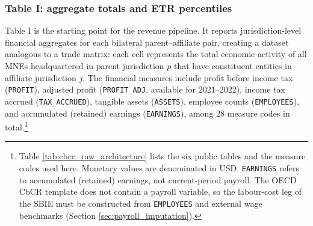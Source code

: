 \documentclass[11pt,a4paper]{article}
\newcommand{\code}[1]{\texttt{#1}}
\begin{document}
\subsubsection{Table I: aggregate totals and ETR percentiles}\label{sec:t1_main}

Table I is the starting point for the revenue pipeline. It reports jurisdiction-level financial aggregates for each bilateral parent--affiliate pair, creating a dataset analogous to a trade matrix: each cell represents the total economic activity of all MNEs headquartered in parent jurisdiction $p$ that have constituent entities in affiliate jurisdiction $j$. The financial measures include profit before income tax (\code{PROFIT}), adjusted profit (\code{PROFIT\_ADJ}, available for 2021--2022), income tax accrued (\code{TAX\_ACCRUED}), tangible assets (\code{ASSETS}), employee counts (\code{EMPLOYEES}), and accumulated (retained) earnings (\code{EARNINGS}), among 28 measure codes in total.\footnote{Table \ref{tab:cbcr_raw_architecture} lists the six public tables and the measure codes used here. Monetary values are denominated in USD. \code{EARNINGS} refers to accumulated (retained) earnings, not current-period payroll. The OECD CbCR template does not contain a payroll variable, so the labour-cost leg of the SBIE must be constructed from \code{EMPLOYEES} and external wage benchmarks (Section \ref{sec:payroll_imputation}).}
\end{document}
